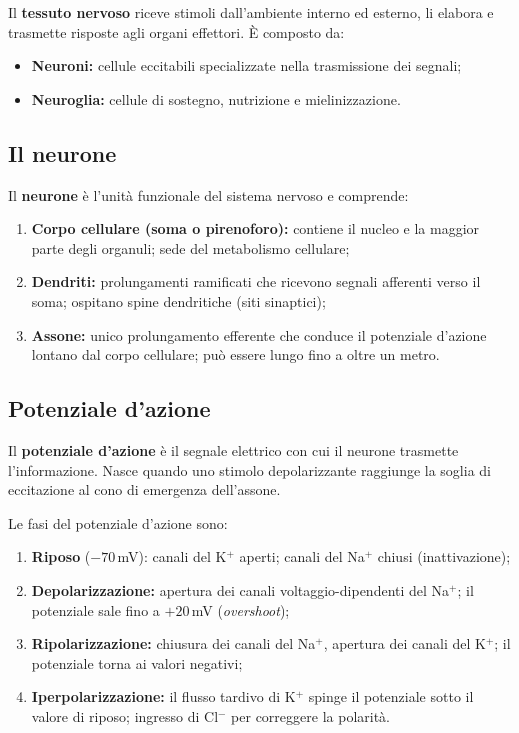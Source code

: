 \documentclass[11pt,a4paper,openright,twoside]{book}
\theoremstyle{definition}
\theoremstyle{plain}
\theoremstyle{remark}
\begin{document}
Il \textbf{tessuto nervoso} riceve stimoli dall'ambiente interno ed esterno, li elabora e trasmette risposte agli organi effettori. È composto da:
\begin{itemize}
  \item \textbf{Neuroni:} cellule eccitabili specializzate nella trasmissione dei segnali;
  \item \textbf{Neuroglia:} cellule di sostegno, nutrizione e mielinizzazione.
\end{itemize}

\subsection{Il neurone}

Il \textbf{neurone} è l'unità funzionale del sistema nervoso e comprende:
\begin{enumerate}
  \item \textbf{Corpo cellulare (soma o pirenoforo):} contiene il nucleo e la maggior parte degli organuli; sede del metabolismo cellulare;
  \item \textbf{Dendriti:} prolungamenti ramificati che ricevono segnali afferenti verso il soma; ospitano spine dendritiche (siti sinaptici);
  \item \textbf{Assone:} unico prolungamento efferente che conduce il potenziale d'azione lontano dal corpo cellulare; può essere lungo fino a oltre un metro.
\end{enumerate}

\subsection{Potenziale d'azione}

Il \textbf{potenziale d'azione} è il segnale elettrico con cui il neurone trasmette l'informazione. Nasce quando uno stimolo depolarizzante raggiunge la soglia di eccitazione al cono di emergenza dell'assone.

Le fasi del potenziale d'azione sono:
\begin{enumerate}
  \item \textbf{Riposo} ($-70$\,mV): canali del K$^+$ aperti; canali del Na$^+$ chiusi (inattivazione);
  \item \textbf{Depolarizzazione:} apertura dei canali voltaggio-dipendenti del Na$^+$; il potenziale sale fino a $+20$\,mV (\textit{overshoot});
  \item \textbf{Ripolarizzazione:} chiusura dei canali del Na$^+$, apertura dei canali del K$^+$; il potenziale torna ai valori negativi;
  \item \textbf{Iperpolarizzazione:} il flusso tardivo di K$^+$ spinge il potenziale sotto il valore di riposo; ingresso di Cl$^-$ per correggere la polarità.
\end{enumerate}
\end{document}
